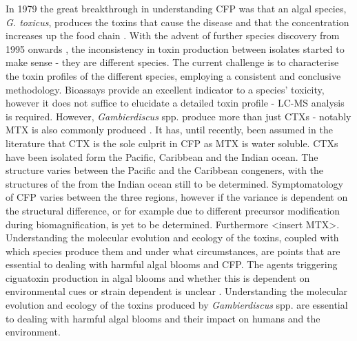 \documentclass[12pt]{article}
\begin{document}

In 1979 the great breakthrough in understanding CFP was that an algal species, \emph{G.  toxicus}, produces the toxins that cause the disease and that the concentration increases up the food chain \citep{adachi1979thecal}. With the advent of further species discovery from 1995 onwards \cite{faust1995observation}, the inconsistency in toxin production between isolates started to make sense - they are different species. The current challenge is to characterise the toxin profiles of the different species, employing a consistent and conclusive methodology. Bioassays provide an excellent indicator to a species' toxicity, however it does not suffice to elucidate a detailed toxin profile - LC-MS analysis is required. However, \emph{Gambierdiscus} spp. produce more than just CTXs - notably MTX is also commonly produced \cite{holmes1994purification,murata1993structure}. It has, until recently, been assumed in the literature that CTX is the sole culprit in CFP as MTX is water soluble. CTXs have been isolated form the Pacific, Caribbean and the Indian ocean. The  structure varies between the Pacific and the Caribbean congeners, with the structures of the from the Indian ocean still to be determined. Symptomatology of CFP varies between the three regions, however if the variance is dependent on  the structural difference, or for example due to different precursor modification during biomagnification, is yet to be determined. Furthermore <insert MTX>. Understanding the molecular evolution and ecology of the toxins, coupled with which species produce them and under what circumstances, are points that are essential to dealing with harmful algal blooms and CFP.  
The agents triggering ciguatoxin production in algal blooms and whether this is dependent on environmental cues or strain dependent is unclear \cite{lewis2006ciguatera}.
Understanding the molecular evolution and ecology of the toxins produced by \emph{Gambierdiscus} spp. are essential to dealing with harmful algal blooms and their impact on humans and the environment. \\
\end{document}
